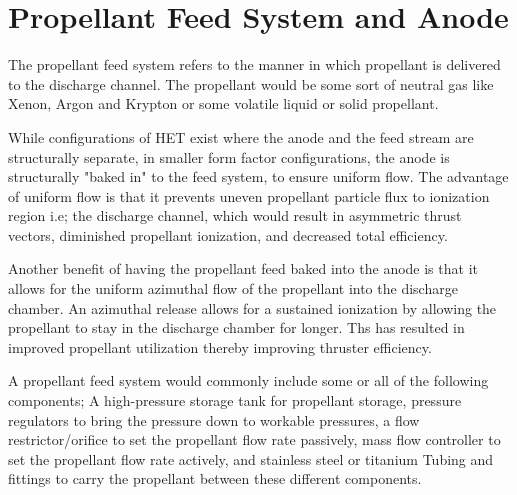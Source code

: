 \section{Propellant Feed System and Anode}



The propellant feed system refers to the manner in which propellant is delivered to the discharge channel. The propellant would be some sort of neutral gas like Xenon, Argon and Krypton or some volatile liquid or solid propellant.


While configurations of \ac{HET} exist where the anode and the feed stream are structurally separate, in smaller form factor configurations, the anode is structurally "baked in" to the feed system, to ensure uniform flow. The advantage of uniform flow is that it prevents uneven propellant particle flux to ionization region i.e; the discharge channel, which would result in asymmetric thrust vectors, diminished propellant ionization, and decreased total efficiency.


Another benefit of having the propellant feed baked into the anode is that it allows for the uniform azimuthal flow of the propellant into the discharge chamber. An azimuthal release allows for a sustained ionization by allowing the propellant to stay in the discharge chamber for longer. Ths has resulted in improved propellant utilization thereby improving thruster efficiency.


A propellant feed system would commonly include some or all of the following components; A high-pressure storage tank for propellant storage, pressure regulators to bring the pressure down to workable pressures, a flow restrictor/orifice to set the propellant flow rate passively, mass flow controller to set the propellant flow rate actively, and stainless steel or titanium Tubing and fittings to carry the propellant between these different components. 
